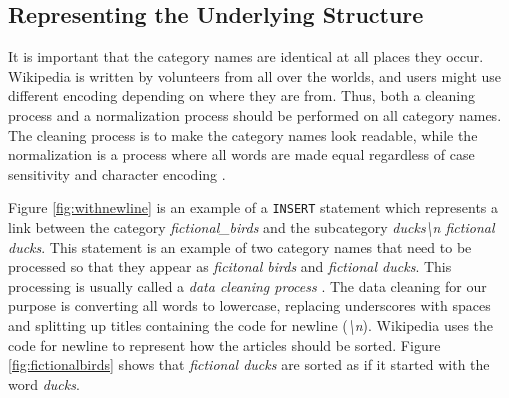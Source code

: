 \subsection{Representing the Underlying Structure}
\label{sec:representingtheunderlyingstructure}
It is important that the category names are identical at all places they occur. Wikipedia is written by volunteers from all over the worlds, and users might use different encoding depending on where they are from. Thus, both a cleaning process and a normalization process should be performed on all category names. The cleaning process is to make the category names look readable, while the normalization is a process where all words are made equal regardless of case sensitivity and character encoding \cite[][p.~26]{iirbook}.

Figure \ref{fig:withnewline} is an example of a \texttt{INSERT} statement which represents a link between the category \emph{fictional\_birds} and the subcategory \emph{ducks\textbackslash n fictional ducks}. This statement is an example of two category names that need to be processed so that they appear as \emph{ficitonal birds} and \emph{fictional ducks}. This processing  is usually called a \emph{data cleaning process} \cite{datacleaning}. The data cleaning for our purpose is converting all words to lowercase, replacing underscores with spaces and splitting up titles containing the code for newline (\emph{\textbackslash n}). Wikipedia uses the code for newline to represent how the articles should be sorted. Figure \ref{fig:fictionalbirds} shows that \emph{fictional ducks} are sorted as if it started with the word \emph{ducks}.


